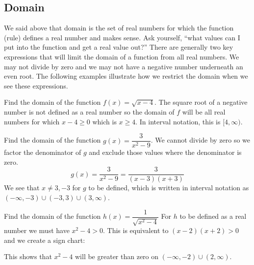 \subsection{Domain}

We said above that domain is the set of real numbers for which the function (rule) defines a real number and makes sense. Ask yourself, ``what values can I put into the function and get a real value out?'' There are generally two key expressions that will limit the domain of a function from all real numbers. We may not divide by zero and we may not have a negative number underneath an even root. The following examples illustrate how we restrict the domain when we see these expressions.

\begin{example}\label{prereq_domain_1}%
Find the domain of the function $f(x)=\sqrt{x-4}$.
\solution
The square root of a negative number is not defined as a real number so the domain of $f$ will be all real numbers for which $x-4\geq 0$ which is $x \geq 4$. In interval notation, this is $[4,\infty)$.
\end{example}

\begin{example}\label{prereq_domain_2}%
Find the domain of the function $g(x)= \dfrac{3}{x^2-9}$.
\solution
We cannot divide by zero so we factor the denominator of $g$ and exclude those values where the denominator is zero.
\[g(x)=\frac3{x^2-9}=\frac3{(x-3)(x+3)}\]
We see that $x\neq 3,-3$ for $g$ to be defined, which is written in interval notation as $(-\infty,-3)\cup (-3,3)\cup (3,\infty)$.
\end{example}

\begin{example}\label{prereq_domain_3}%
Find the domain of the function $h(x)=\dfrac1{\sqrt{x^2-4}}$
\solution
For $h$ to be defined as a real number we must have $x^2-4>0$. This is equivalent to $(x-2)(x+2)>0$ and we create a sign chart:

\begin{center}
\end{center}

This shows that $x^2-4$ will be greater than zero on $(-\infty,-2)\cup(2,\infty)$.
\end{example}


